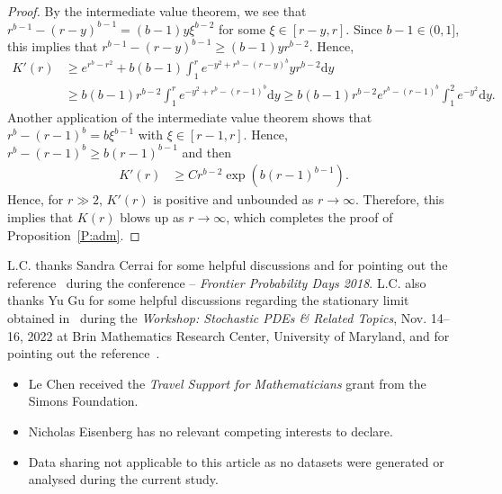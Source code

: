 \documentclass[sn-mathphys]{sn-jnl}%
\newcommand{\ud}{\ensuremath{\mathrm{d}}}
\numberwithin{equation}{section}
\theoremstyle{thmstyleone}%
\theoremstyle{thmstyletwo}%
\theoremstyle{thmstylethree}%
\begin{document}
\begin{proof}
  By the intermediate value theorem, we see that $r^{b-1} - (r-y)^{b-1} = (b-1) y \xi^{b-2}$ for
  some $\xi\in [r-y,r]$. Since $b-1\in(0,1]$, this implies that $r^{b-1} - (r-y)^{b-1} \ge (b-1) y
  r^{b-2}$. Hence,
	\begin{align*}
	K'(r) & \ge  e^{r^b-r^2} + b(b-1) \int_1^r e^{ - y^2 + r^b - (r-y)^b } y r^{b-2} \ud y \\
	& \ge  b(b-1)r^{b-2} \int_1^r e^{ - y^2 + r^b - (r-1)^b }  \ud y
	\ge  b(b-1)r^{b-2} e^{r^b-(r-1)^b}\int_1^2 e^{ - y^2 } \ud y.
	\end{align*}
  Another application of the intermediate value theorem shows that $r^b-(r-1)^b = b \xi^{b-1}$ with
  $\xi\in [r-1,r]$. Hence, $r^b-(r-1)^b \ge b (r-1)^{b-1}$ and then
	\begin{align*}
	K'(r) & \ge C r^{b-2} \exp\left(b (r-1)^{b-1}\right).
	\end{align*}
  Hence, for $r \gg 2$, $K'(r)$ is positive and unbounded as $r\to\infty$. Therefore, this implies
  that $K(r)$ blows up as $r\to\infty$, which completes the proof of Proposition~\ref{P:adm}.
\end{proof}

\backmatter


L.C. thanks Sandra Cerrai for some helpful discussions and for pointing out the
reference~\cite{misiats.stanzhytskyi.ea:16:existence} during the conference -- \textit{Frontier
Probability Days 2018}. L.C. also thanks Yu Gu for some helpful discussions regarding the stationary
limit obtained in~\cite{gu.li:20:fluctuations} during the \textit{Workshop: Stochastic PDEs \&
Related Topics}, Nov. 14--16, 2022 at Brin Mathematics Research Center, University of Maryland, and
for pointing out the reference~\cite{dunlap.gu.ea:21:random}.

\begin{itemize}
	\item Le Chen received the {\it Travel Support for Mathematicians} grant from the Simons Foundation.
	\item Nicholas Eisenberg has no relevant competing interests to declare.
	\item  Data sharing not applicable to this article as no datasets were generated or analysed during the current study.
\end{itemize}

\end{document}
